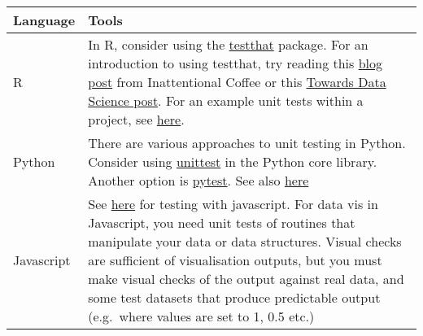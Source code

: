 \documentclass[]{book}
\begin{document}
\begin{longtable}[]{@{}ll@{}}
\toprule
\begin{minipage}[b]{0.21\columnwidth}\raggedright
Language\strut
\end{minipage} & \begin{minipage}[b]{0.73\columnwidth}\raggedright
Tools\strut
\end{minipage}\tabularnewline
\midrule
\endhead
\begin{minipage}[t]{0.21\columnwidth}\raggedright
R\strut
\end{minipage} & \begin{minipage}[t]{0.73\columnwidth}\raggedright
In R, consider using the \href{https://github.com/r-lib/testthat}{testthat} package. For an introduction to using testthat, try reading this \href{https://katherinemwood.github.io/post/testthat/}{blog post} from Inattentional Coffee or this \href{https://towardsdatascience.com/unit-testing-in-r-68ab9cc8d211}{Towards Data Science post}. For an example unit tests within a project, see \href{https://github.com/RobinL/costmodelr/tree/master/tests}{here}.\strut
\end{minipage}\tabularnewline
\begin{minipage}[t]{0.21\columnwidth}\raggedright
Python\strut
\end{minipage} & \begin{minipage}[t]{0.73\columnwidth}\raggedright
There are various approaches to unit testing in Python. Consider using \href{https://docs.python.org/3/library/unittest.html}{unittest} in the Python core library. Another option is \href{https://docs.pytest.org/en/latest/}{pytest}. See also \href{http://python-guide-pt-br.readthedocs.io/en/latest/writing/tests/}{here}\strut
\end{minipage}\tabularnewline
\begin{minipage}[t]{0.21\columnwidth}\raggedright
Javascript\strut
\end{minipage} & \begin{minipage}[t]{0.73\columnwidth}\raggedright
See \href{http://busypeoples.github.io/post/testing-d3-with-jasmine/}{here} for testing with javascript. For data vis in Javascript, you need unit tests of routines that manipulate your data or data structures. Visual checks are sufficient of visualisation outputs, but you must make visual checks of the output against real data, and some test datasets that produce predictable output (e.g.~where values are set to 1, 0.5 etc.)\strut
\end{minipage}\tabularnewline
\bottomrule
\end{longtable}
\end{document}
